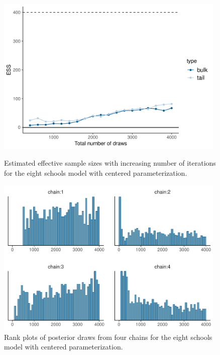 \documentclass[american,]{article}
\begin{document}
\begin{figure}[tp]
  \centering
  \begin{minipage}{0.48\textwidth}
  \includegraphics[width=0.98\textwidth]{graphics/change-ess-fit-cp-1.pdf}
  \caption{Estimated effective sample sizes with increasing number of iterations
  for the eight schools model with centered parameterization.}
  \label{fig:change-ess-fit-cp-1}
\end{minipage}
\hfill
  \begin{minipage}{0.48\textwidth}
  \includegraphics[width=0.98\textwidth]{graphics/hist-fit-cp-1.pdf}
  \caption{Rank plots of posterior draws from four chains for the eight schools 
  model with centered parameterization.}
  \label{fig:hist-fit-cp-1}
\end{minipage}
\end{figure}
\end{document}
